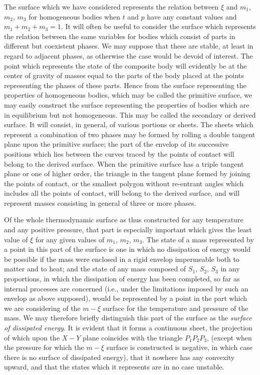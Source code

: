 \documentclass[12pt]{memoir}
\begin{document}
The surface which we have considered represents the relation between $\xi$ and $m_1$, $m_2$, $m_3$ for homogeneous bodies when $t$ and $p$ have any constant values and $m_1+m_2+m_3= 1$. It will often be useful to consider the surface which represents the relation between the same variables for bodies which consist of parts in different but coexistent phases. We may suppose that these are stable, at least in regard to adjacent phases, as otherwise the case would be devoid of interest. The point which represents the state of the composite body will evidently be at the center of gravity of masses equal to the parts of the body placed at the points representing the phases of these parts. Hence from the surface representing the properties of homogeneous bodies, which may be called the primitive surface, we may easily construct the surface representing the properties of bodies which are in equilibrium but not homogeneous. This may be called the secondary or derived surface. It will consist, in general, of various portions or sheets. The sheets which represent a combination of two phases may be formed by rolling a double tangent plane upon the primitive surface; the part of the envelop of its successive positions which lies between the curves traced by the points of contact will belong to the derived surface. When the primitive surface has a triple tangent plane or one of higher order, the triangle in the tangent plane formed by joining the points of contact, or the smallest polygon without re-entrant angles which includes all the points of contact, will belong to the derived surface, and will represent masses consisting in general of three or more phases.


Of the whole thermodynamic surface as thus constructed for any temperature and any positive pressure, that part is especially important which gives the least value of $\xi$ for any given values of $m_1$, $m_2$, $m_3$. The state of a mass represented by a point in this part of the surface is one in which no dissipation of energy would be possible if the mass were enclosed in a rigid envelop impermeable both to matter and to heat; and the state of any mass composed of $S_1$, $S_2$, $S_3$ in any proportions, in which the dissipation of energy has been completed, so far as internal processes are concerned (i.e., under the limitations imposed by such an envelop as above supposed), would be represented by a point in the part which we are considering of the $m\!-\xi$ surface for the temperature and pressure of the mass. We may therefore briefly distinguish this part of the surface as the \textit{surface of dissipated energy}. It is evident that it forms a continuous sheet, the projection of which upon the $X\!-Y$ plane coincides with the triangle $P_1 P_2 P_3$, (except when the pressure for which the $m\!-\xi$ surface is constructed is negative, in which case there is no surface of dissipated energy), that it nowhere has any convexity upward, and that the states which it represents are in no case unstable.
\end{document}
